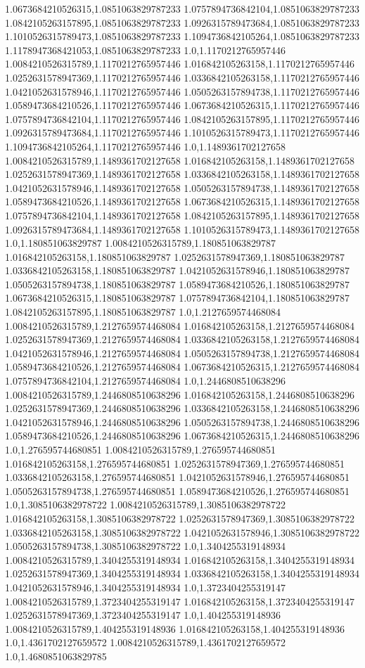 1.0673684210526315,1.0851063829787233
1.0757894736842104,1.0851063829787233
1.0842105263157895,1.0851063829787233
1.0926315789473684,1.0851063829787233
1.1010526315789473,1.0851063829787233
1.1094736842105264,1.0851063829787233
1.1178947368421053,1.0851063829787233
1.0,1.1170212765957446
1.0084210526315789,1.1170212765957446
1.016842105263158,1.1170212765957446
1.0252631578947369,1.1170212765957446
1.0336842105263158,1.1170212765957446
1.0421052631578946,1.1170212765957446
1.0505263157894738,1.1170212765957446
1.0589473684210526,1.1170212765957446
1.0673684210526315,1.1170212765957446
1.0757894736842104,1.1170212765957446
1.0842105263157895,1.1170212765957446
1.0926315789473684,1.1170212765957446
1.1010526315789473,1.1170212765957446
1.1094736842105264,1.1170212765957446
1.0,1.1489361702127658
1.0084210526315789,1.1489361702127658
1.016842105263158,1.1489361702127658
1.0252631578947369,1.1489361702127658
1.0336842105263158,1.1489361702127658
1.0421052631578946,1.1489361702127658
1.0505263157894738,1.1489361702127658
1.0589473684210526,1.1489361702127658
1.0673684210526315,1.1489361702127658
1.0757894736842104,1.1489361702127658
1.0842105263157895,1.1489361702127658
1.0926315789473684,1.1489361702127658
1.1010526315789473,1.1489361702127658
1.0,1.180851063829787
1.0084210526315789,1.180851063829787
1.016842105263158,1.180851063829787
1.0252631578947369,1.180851063829787
1.0336842105263158,1.180851063829787
1.0421052631578946,1.180851063829787
1.0505263157894738,1.180851063829787
1.0589473684210526,1.180851063829787
1.0673684210526315,1.180851063829787
1.0757894736842104,1.180851063829787
1.0842105263157895,1.180851063829787
1.0,1.2127659574468084
1.0084210526315789,1.2127659574468084
1.016842105263158,1.2127659574468084
1.0252631578947369,1.2127659574468084
1.0336842105263158,1.2127659574468084
1.0421052631578946,1.2127659574468084
1.0505263157894738,1.2127659574468084
1.0589473684210526,1.2127659574468084
1.0673684210526315,1.2127659574468084
1.0757894736842104,1.2127659574468084
1.0,1.2446808510638296
1.0084210526315789,1.2446808510638296
1.016842105263158,1.2446808510638296
1.0252631578947369,1.2446808510638296
1.0336842105263158,1.2446808510638296
1.0421052631578946,1.2446808510638296
1.0505263157894738,1.2446808510638296
1.0589473684210526,1.2446808510638296
1.0673684210526315,1.2446808510638296
1.0,1.276595744680851
1.0084210526315789,1.276595744680851
1.016842105263158,1.276595744680851
1.0252631578947369,1.276595744680851
1.0336842105263158,1.276595744680851
1.0421052631578946,1.276595744680851
1.0505263157894738,1.276595744680851
1.0589473684210526,1.276595744680851
1.0,1.3085106382978722
1.0084210526315789,1.3085106382978722
1.016842105263158,1.3085106382978722
1.0252631578947369,1.3085106382978722
1.0336842105263158,1.3085106382978722
1.0421052631578946,1.3085106382978722
1.0505263157894738,1.3085106382978722
1.0,1.3404255319148934
1.0084210526315789,1.3404255319148934
1.016842105263158,1.3404255319148934
1.0252631578947369,1.3404255319148934
1.0336842105263158,1.3404255319148934
1.0421052631578946,1.3404255319148934
1.0,1.3723404255319147
1.0084210526315789,1.3723404255319147
1.016842105263158,1.3723404255319147
1.0252631578947369,1.3723404255319147
1.0,1.404255319148936
1.0084210526315789,1.404255319148936
1.016842105263158,1.404255319148936
1.0,1.4361702127659572
1.0084210526315789,1.4361702127659572
1.0,1.4680851063829785
